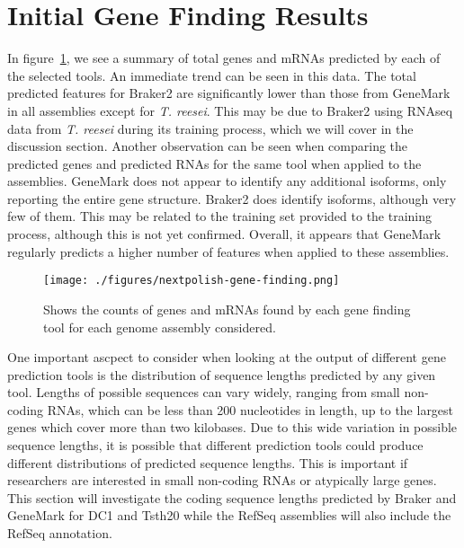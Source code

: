 \section{Initial Gene Finding Results} 

In figure~\ref{fig:genecounts}, we see a summary of total genes and mRNAs
predicted by each of the selected tools. An immediate trend can be
seen in this data. The total predicted features for Braker2 are
significantly lower than those from GeneMark in all assemblies except
for \textit{T. reesei}. This may be due to Braker2 using RNAseq data
from \textit{T. reesei} during its training process, which we will
cover in the discussion section. Another observation can be seen when
comparing the predicted genes and predicted RNAs for the same tool
when applied to the assemblies. GeneMark does not appear to identify
any additional isoforms, only reporting the entire gene
structure. Braker2 does identify isoforms, although very few of
them. This may be related to the training set provided to the training
process, although this is not yet confirmed. Overall, it appears that
GeneMark regularly predicts a higher number of features when applied
to these assemblies.

\begin{figure}
  \texttt{[image: ./figures/nextpolish-gene-finding.png]}
  \caption[Counts of predicted genes and mRNAs]{Shows the counts of
    genes and mRNAs found by each gene finding tool for each genome
    assembly considered.}
  \label{fig:genecounts}
\end{figure}

One important ascpect to consider when looking at the output of
different gene prediction tools is the distribution of sequence
lengths predicted by any given tool. Lengths of possible sequences can
vary widely, ranging from small non-coding RNAs, which can be less
than 200 nucleotides in length, up to the largest genes which cover
more than two kilobases. Due to this wide variation in possible
sequence lengths, it is possible that different prediction tools could
produce different distributions of predicted sequence lengths. This is
important if researchers are interested in small non-coding RNAs or
atypically large genes. This section will investigate the coding
sequence lengths predicted by Braker and GeneMark for DC1 and Tsth20
while the RefSeq assemblies will also include the RefSeq annotation.


